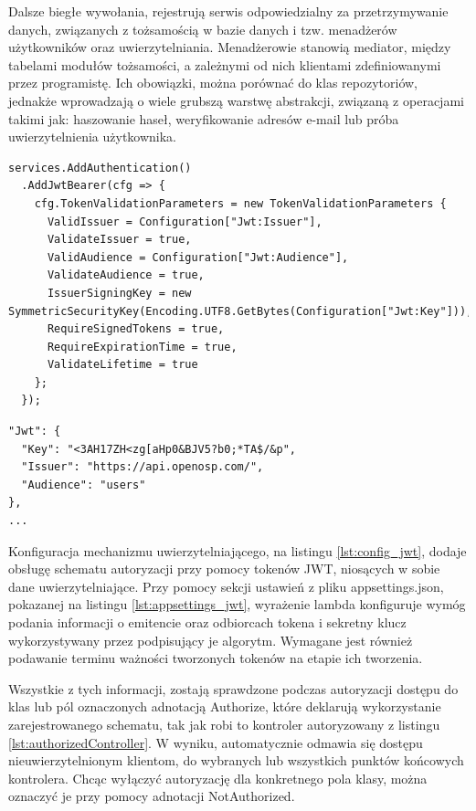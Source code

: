 Dalsze biegłe wywołania, rejestrują serwis odpowiedzialny za przetrzymywanie danych, związanych z tożsamością w bazie danych i tzw. menadżerów użytkowników oraz uwierzytelniania. Menadżerowie stanowią mediator, między tabelami modułów tożsamości, a zależnymi od nich klientami zdefiniowanymi przez programistę. Ich obowiązki, można porównać do klas repozytoriów, jednakże wprowadzają o wiele grubszą warstwę abstrakcji, związaną z operacjami takimi jak: haszowanie haseł, weryfikowanie adresów e-mail lub próba uwierzytelnienia użytkownika.

\begin{lstlisting}[language=CSharp, caption={Konfiguracja tokenów JWT jako mechanizmu niosącego w sobie dane uwierzytelniające}, label=lst:config_jwt]
services.AddAuthentication()
  .AddJwtBearer(cfg => {
    cfg.TokenValidationParameters = new TokenValidationParameters {
      ValidIssuer = Configuration["Jwt:Issuer"],
      ValidateIssuer = true,
      ValidAudience = Configuration["Jwt:Audience"],
      ValidateAudience = true,
      IssuerSigningKey = new SymmetricSecurityKey(Encoding.UTF8.GetBytes(Configuration["Jwt:Key"])),
      RequireSignedTokens = true,
      RequireExpirationTime = true,
      ValidateLifetime = true
    };
  });
\end{lstlisting}

\begin{lstlisting}[language=CSharp, caption={Konfiguracja tokenów JWT w pliku appsettings.json}, label=lst:appsettings_jwt]
"Jwt": {
  "Key": "<3AH17ZH<zg[aHp0&BJV5?b0;*TA$/&p",
  "Issuer": "https://api.openosp.com/",
  "Audience": "users"
},
...
\end{lstlisting}

Konfiguracja mechanizmu uwierzytelniającego, na listingu \ref{lst:config_jwt}, dodaje obsługę schematu autoryzacji przy pomocy tokenów JWT, niosących w sobie dane uwierzytelniające. Przy pomocy sekcji ustawień z pliku appsettings.json, pokazanej na listingu \ref{lst:appsettings_jwt}, wyrażenie lambda konfiguruje wymóg podania informacji o emitencie oraz odbiorcach tokena i sekretny klucz wykorzystywany przez podpisujący je algorytm. Wymagane jest również podawanie terminu ważności tworzonych tokenów na etapie ich tworzenia.

Wszystkie z tych informacji, zostają sprawdzone podczas autoryzacji dostępu do klas lub pól oznaczonych adnotacją Authorize, które deklarują wykorzystanie zarejestrowanego schematu, tak jak robi to kontroler autoryzowany z listingu \ref{lst:authorizedController}. W wyniku, automatycznie odmawia się dostępu nieuwierzytelnionym klientom, do wybranych lub wszystkich punktów końcowych kontrolera. Chcąc wyłączyć autoryzację dla konkretnego pola klasy, można oznaczyć je przy pomocy adnotacji NotAuthorized.

